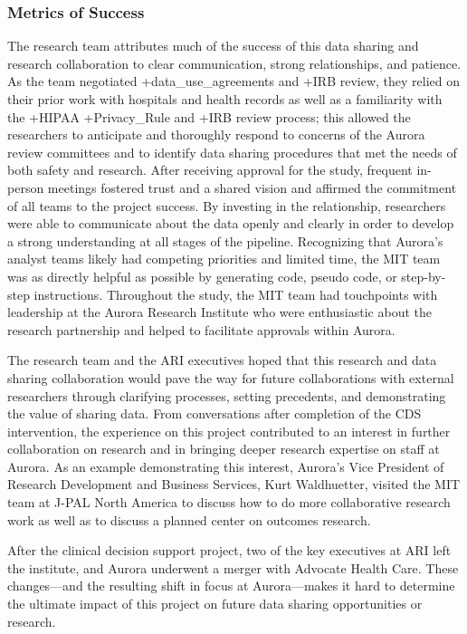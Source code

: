 \documentclass[
]{WileySix}
\begin{document}
\hypertarget{metrics-of-success-4}{%
\subsubsection{Metrics of Success}\label{metrics-of-success-4}}

The research team attributes much of the success of this data sharing and research collaboration to clear communication, strong relationships, and patience. As the team negotiated +data\_use\_agreements\textbar{} and +IRB\textbar{} review, they relied on their prior work with hospitals and health records as well as a familiarity with the +HIPAA\textbar{} +Privacy\_Rule\textbar{} and +IRB\textbar{} review process; this allowed the researchers to anticipate and thoroughly respond to concerns of the Aurora review committees and to identify data sharing procedures that met the needs of both safety and research. After receiving approval for the study, frequent in-person meetings fostered trust and a shared vision and affirmed the commitment of all teams to the project success. By investing in the relationship, researchers were able to communicate about the data openly and clearly in order to develop a strong understanding at all stages of the pipeline. Recognizing that Aurora's analyst teams likely had competing priorities and limited time, the MIT team was as directly helpful as possible by generating code, pseudo code, or step-by-step instructions. Throughout the study, the MIT team had touchpoints with leadership at the Aurora Research Institute who were enthusiastic about the research partnership and helped to facilitate approvals within Aurora.

The research team and the ARI executives hoped that this research and data sharing collaboration would pave the way for future collaborations with external researchers through clarifying processes, setting precedents, and demonstrating the value of sharing data. From conversations after completion of the CDS intervention, the experience on this project contributed to an interest in further collaboration on research and in bringing deeper research expertise on staff at Aurora. As an example demonstrating this interest, Aurora's Vice President of Research Development and Business Services, Kurt Waldhuetter, visited the MIT team at J-PAL North America to discuss how to do more collaborative research work as well as to discuss a planned center on outcomes research.

After the clinical decision support project, two of the key executives at ARI left the institute, and Aurora underwent a merger with Advocate Health Care. These changes---and the resulting shift in focus at Aurora---makes it hard to determine the ultimate impact of this project on future data sharing opportunities or research.
\end{document}
